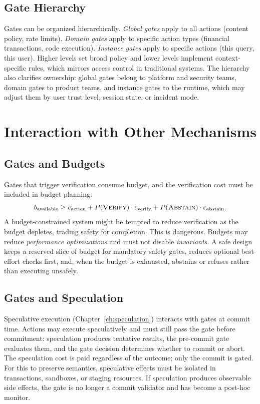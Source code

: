 \documentclass[11pt]{book}
\begin{document}
\subsection{Gate Hierarchy}

Gates can be organized hierarchically. \textit{Global gates} apply to all actions (content policy, rate limits). \textit{Domain gates} apply to specific action types (financial transactions, code execution). \textit{Instance gates} apply to specific actions (this query, this user). Higher levels set broad policy and lower levels implement context-specific rules, which mirrors access control in traditional systems. The hierarchy also clarifies ownership: global gates belong to platform and security teams, domain gates to product teams, and instance gates to the runtime, which may adjust them by user trust level, session state, or incident mode.

\section{Interaction with Other Mechanisms}

\subsection{Gates and Budgets}

Gates that trigger verification consume budget, and the verification cost must be included in budget planning:
\[
b_{\text{available}} \geq c_{\text{action}} + P(\textsc{Verify}) \cdot c_{\text{verify}} + P(\textsc{Abstain}) \cdot c_{\text{abstain}}.
\]
A budget-constrained system might be tempted to reduce verification as the budget depletes, trading safety for completion. This is dangerous. Budgets may reduce \textit{performance optimizations} and must not disable \textit{invariants}. A safe design keeps a reserved slice of budget for mandatory safety gates, reduces optional best-effort checks first, and, when the budget is exhausted, abstains or refuses rather than executing unsafely.

\subsection{Gates and Speculation}

Speculative execution (Chapter~\ref{ch:speculation}) interacts with gates at commit time. Actions may execute speculatively and must still pass the gate before commitment: speculation produces tentative results, the pre-commit gate evaluates them, and the gate decision determines whether to commit or abort. The speculation cost is paid regardless of the outcome; only the commit is gated. For this to preserve semantics, speculative effects must be isolated in transactions, sandboxes, or staging resources. If speculation produces observable side effects, the gate is no longer a commit validator and has become a post-hoc monitor.
\end{document}
